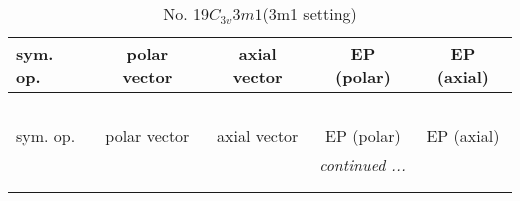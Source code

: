 \documentclass[fleqn,10pt,landscape]{jsarticle}
\begin{document}
\newpage
\begin{center}
\renewcommand{\arraystretch}{1.3}
\begin{longtable}{lcccc}
\caption{No. 19\quad$C_{3v}$\quad$3m1$\quad(3m1 setting)\quad[ trigonal ]}
 \\
 \hline \hline
sym. op. & polar vector & axial vector & EP (polar) & EP (axial) \\ \hline \endfirsthead

\multicolumn{4}{l}{\tablename\ \thetable{}} \\
 \hline \hline
sym. op. & polar vector & axial vector & EP (polar) & EP (axial) \\ \hline \endhead

 \hline \hline
\multicolumn{4}{r}{\footnotesize\it continued ...} \\ \endfoot

 \hline \hline
\multicolumn{4}{r}{} \\ \endlastfoot


\end{longtable}
\end{center}
\end{document}
